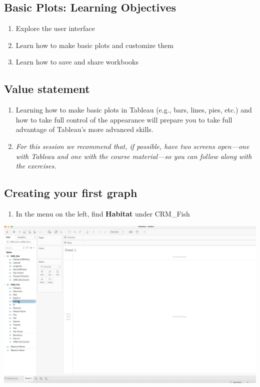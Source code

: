 \documentclass[
]{book}
\providecommand{\tightlist}{%
  \setlength{\itemsep}{0pt}\setlength{\parskip}{0pt}}
\begin{document}
\hypertarget{basic-plots-learning-objectives}{%
\subsection{Basic Plots: Learning Objectives}\label{basic-plots-learning-objectives}}

\begin{enumerate}
\def\labelenumi{\arabic{enumi}.}
\item
  Explore the user interface
\item
  Learn how to make basic plots and customize them
\item
  Learn how to save and share workbooks
\end{enumerate}

\hypertarget{value-statement-2}{%
\subsection{Value statement}\label{value-statement-2}}

\begin{enumerate}
\def\labelenumi{\arabic{enumi}.}
\item
  Learning how to make basic plots in Tableau (e.g., bars, lines, pies, etc.) and how to take full control of the appearance will prepare you to take full advantage of Tableau's more advanced skills.
\item
  \emph{For this session we recommend that, if possible, have two screens open---one with Tableau and one with the course material---so you can follow along with the exercises.}
\end{enumerate}

\hypertarget{creating-your-first-graph}{%
\subsection{Creating your first graph}\label{creating-your-first-graph}}

\begin{enumerate}
\def\labelenumi{\arabic{enumi}.}
\tightlist
\item
  In the menu on the left, find \textbf{Habitat} under CRM\_Fish
\end{enumerate}

\includegraphics{images/M3S2_find-habitat.png}
\end{document}
